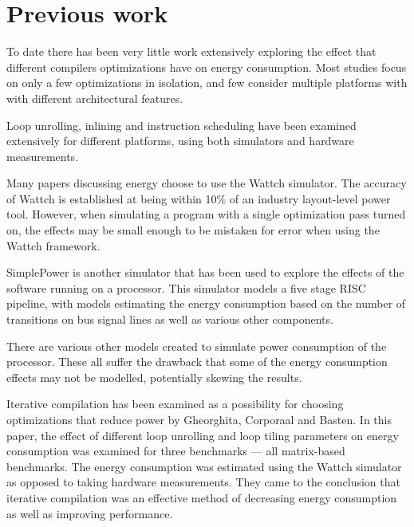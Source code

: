 \documentclass[twocolumn]{article}
\newcommand{\nsection}[1]{\section{\bfseries #1}}
\begin{document}
\nsection{Previous work}

To date there has been very little work extensively exploring the effect that different compilers optimizations have on energy consumption. Most studies focus on only a few optimizations in isolation, and few consider multiple platforms with with different architectural features.

Loop unrolling, inlining and instruction scheduling have been examined extensively for different platforms, using both simulators and hardware measurements\cite{EffectOfCompilerOptimizationsOnPentium4}.

Many papers discussing energy choose to use the Wattch simulator\cite{Wattch}. The accuracy of Wattch is established at being within 10\% of an industry layout-level power tool. However, when simulating a program with a single optimization pass turned on, the effects may be small enough to be mistaken for error when using the Wattch framework.

SimplePower\cite{SimplePower} is another simulator that has been used to explore the effects of the software running on a processor. This simulator models a five stage RISC pipeline, with models estimating the energy consumption based on the number of transitions on bus signal lines as well as various other components.

There are various other models created to simulate power consumption of the processor\cite{Park2011,Schneider2005}. These all suffer the drawback that some of the energy consumption effects may not be modelled, potentially skewing the results.

Iterative compilation has been examined as a possibility for choosing optimizations that reduce power by Gheorghita, Corporaal and Basten\cite{IterativeCompilationForEnergy}. In this paper, the effect of different loop unrolling and loop tiling parameters on energy consumption was examined for three benchmarks --- all matrix-based benchmarks. The energy consumption was estimated using the Wattch simulator as opposed to taking hardware measurements. They came to the conclusion that iterative compilation was an effective method of decreasing energy consumption as well as improving performance.
\end{document}
